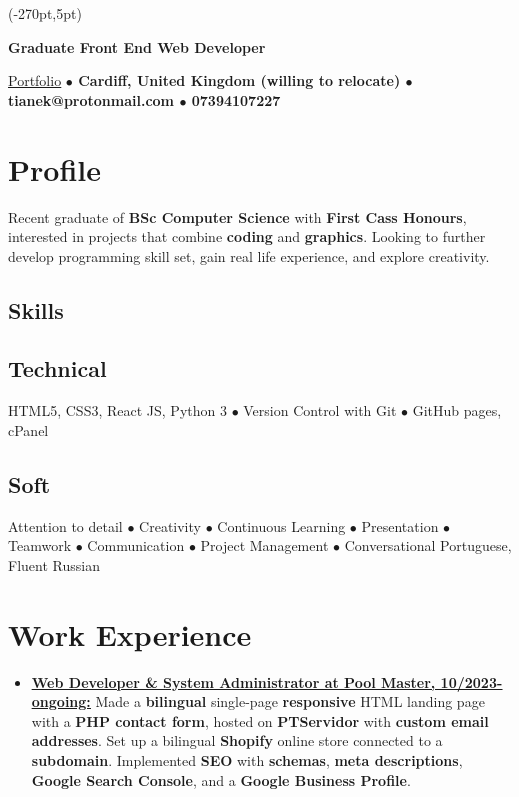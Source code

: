 \documentclass[11pt]{article}
\makeatletter
\newcommand{\verticalline}[1][1pt]{\rule[-0.35ex]{#1}{0.9em}}
\renewcommand{\maketitle}{
\begin{center}
    {\huge\bfseries
    \theauthor \hspace{0.5em}{\verticalline[1.5pt]}\hspace{0.5em}Graduate Front End Web Developer} 

    \vspace{0.7em}

    \ulink{https://orbit-9j.github.io/Portfolio/}{Portfolio} 
    \textbf{$\bullet$  Cardiff, United Kingdom (willing to relocate) $\bullet$ tianek@protonmail.com  $\bullet$ 07394107227}
\end{center}
}
\newcommand{\ulink}[2]{\href{#1}{\uline{#2}}}
\makeatother
\begin{document}
\begin{textblock*}{\paperwidth}(-270pt,5pt)
    \hspace*{\fill}
\end{textblock*}
\vspace*{-0.8cm}
    \author{Rin Tian}
    \maketitle

    \section{Profile}
    Recent graduate of \textbf{BSc Computer Science} with \textbf{First Cass Honours}, interested in projects that combine \textbf{coding} and \textbf{graphics}. Looking to further develop programming skill set, gain real life experience, and explore creativity. 

    \begin{center}
        \section{Skills} 
        \subsection{Technical}
    HTML5, CSS3, React JS, Python 3 $\bullet$ Version Control with Git $\bullet$ GitHub pages, cPanel 
        
        \subsection{Soft}Attention to detail $\bullet$ Creativity $\bullet$ Continuous Learning $\bullet$
        Presentation $\bullet$ Teamwork $\bullet$ Communication $\bullet$ Project Management $\bullet$ Conversational Portuguese, Fluent Russian
    \end{center}
   
    \section{Work Experience}
    \begin{itemize}[itemsep=3pt, leftmargin=1em]
        \item \ulink{https://poolmaster.pt/} {\textbf{Web Developer \& System Administrator at Pool Master, 10/2023-ongoing:}} Made a \textbf{bilingual} single-page \textbf{responsive} HTML landing page with a \textbf{PHP contact form}, hosted on \textbf{PTServidor} with \textbf{custom email addresses}. Set up a bilingual \textbf{Shopify} online store connected to a \textbf{subdomain}. Implemented \textbf{SEO} with \textbf{schemas}, \textbf{meta descriptions}, \textbf{Google Search Console}, and a \textbf{Google Business Profile}.
    \end{itemize}
\end{document}
